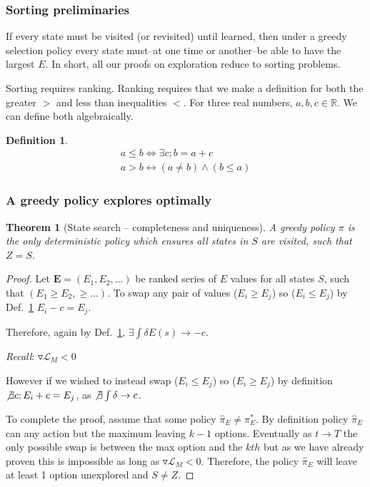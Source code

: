 \documentclass[9pt,twocolumn,twoside]{pnas-new}
\newtheorem{theorem}{Theorem}
\newtheorem{definition}{Definition}
\begin{document}
\subsubsection*{Sorting preliminaries}
If every state must be visited (or revisited) until learned, then under a greedy selection policy every state must--at one time or another--be able to have the largest $E$. In short, all our proofs on exploration reduce to sorting problems.

Sorting requires ranking. Ranking requires that we make a definition for both the greater $>$ and less than inequalities $<$. For three real numbers, ${a,b,c} \in \mathbb{R}$. We can define both algebraically.

\begin{definition} \label{def:ineq}
    \begin{align}
        a \leq b \Leftrightarrow \exists c; b = a + c \\
        a > b \leftrightarrow (a \neq b) \wedge (b \leq a) 
    \end{align}
\end{definition}

\subsubsection*{A greedy policy explores optimally}
\begin{theorem}[State search -- completeness and uniqueness] \label{theorem:Z}
A greedy policy $\pi$ is the only deterministic policy which ensures all states in $S$ are visited, such that $Z = S$.
\end{theorem}
\begin{proof}    
    Let $\textbf{E} = (E_1, E_2, ...)$ be ranked series of $E$ values for all states $S$, such that $(E_1 \geq E_2, \geq ...)$. To swap any pair of values ($E_i \geq E_j$) so ($E_i \leq E_j$) by Def.~\ref{def:ineq} $E_i - c = E_j$.  

    Therefore, again by Def.~\ref{def:ineq}, $\exists \int \delta E(s) \rightarrow -c$. 

    \textit{Recall}: $\triangledown \mathcal{L}_M < 0$

    However if we wished to instead swap ($E_i \leq E_j$) so ($E_i \geq E_j$) by definition $\not \exists c; E_i + c = E_j$, as $\not \exists \int \delta \rightarrow c$. 

    To complete the proof, assume that some policy $\hat \pi_E \neq \pi^*_E$. By definition policy $\hat \pi_E$ can any action but the maximum leaving $k-1$ options. Eventually as $t \rightarrow T$ the only possible swap is between the max option and the $kth$ but as we have already proven this is impossible as long as $\triangledown \mathcal{L}_M < 0$. Therefore, the policy $\hat \pi_E$ will leave at least 1 option unexplored and $S \neq Z$.
\end{proof}
\end{document}
